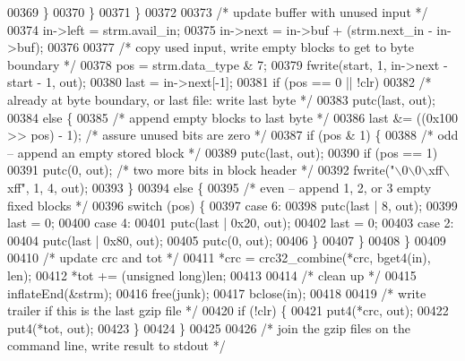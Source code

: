 \begin{DoxyCode}
{00369             \}
00370         \}
00371     \}
00372 
00373     \textcolor{comment}{/* update buffer with unused input */}
00374     in->left = strm.avail\_in;
00375     in->next = in->buf + (strm.next\_in - in->buf);
00376 
00377     \textcolor{comment}{/* copy used input, write empty blocks to get to byte boundary */}
00378     pos = strm.data\_type & 7;
00379     fwrite(start, 1, in->next - start - 1, out);
00380     last = in->next[-1];
00381     \textcolor{keywordflow}{if} (pos == 0 || !clr)
00382         \textcolor{comment}{/* already at byte boundary, or last file: write last byte */}
00383         putc(last, out);
00384     \textcolor{keywordflow}{else} \{
00385         \textcolor{comment}{/* append empty blocks to last byte */}
00386         last &= ((0x100 >> pos) - 1);       \textcolor{comment}{/* assure unused bits are zero */}
00387         \textcolor{keywordflow}{if} (pos & 1) \{
00388             \textcolor{comment}{/* odd -- append an empty stored block */}
00389             putc(last, out);
00390             \textcolor{keywordflow}{if} (pos == 1)
00391                 putc(0, out);               \textcolor{comment}{/* two more bits in block header */}
00392             fwrite(\textcolor{stringliteral}{"\(\backslash\)0\(\backslash\)0\(\backslash\)xff\(\backslash\)xff"}, 1, 4, out);
00393         \}
00394         \textcolor{keywordflow}{else} \{
00395             \textcolor{comment}{/* even -- append 1, 2, or 3 empty fixed blocks */}
00396             \textcolor{keywordflow}{switch} (pos) \{
00397             \textcolor{keywordflow}{case} 6:
00398                 putc(last | 8, out);
00399                 last = 0;
00400             \textcolor{keywordflow}{case} 4:
00401                 putc(last | 0x20, out);
00402                 last = 0;
00403             \textcolor{keywordflow}{case} 2:
00404                 putc(last | 0x80, out);
00405                 putc(0, out);
00406             \}
00407         \}
00408     \}
00409 
00410     \textcolor{comment}{/* update crc and tot */}
00411     *crc = crc32\_combine(*crc, bget4(in), len);
00412     *tot += (\textcolor{keywordtype}{unsigned} long)len;
00413 
00414     \textcolor{comment}{/* clean up */}
00415     inflateEnd(&strm);
00416     free(junk);
00417     bclose(in);
00418 
00419     \textcolor{comment}{/* write trailer if this is the last gzip file */}
00420     \textcolor{keywordflow}{if} (!clr) \{
00421         put4(*crc, out);
00422         put4(*tot, out);
00423     \}
00424 \}
00425 
00426 \textcolor{comment}{/* join the gzip files on the command line, write result to stdout */}
}
\end{DoxyCode}

